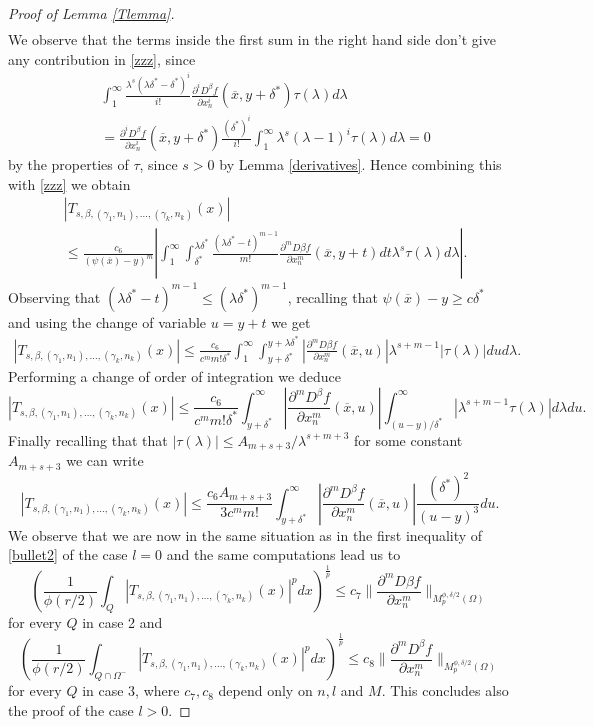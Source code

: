 \documentclass[12pt]{article}
\theoremstyle{definition}
\begin{document}
\begin{proof}[Proof of Lemma \ref{Tlemma}]
\begin{align*}
\end{align*}
We observe that the terms inside the first sum in the right hand side don't give any contribution in \eqref{zzz}, since
\begin{align*} &\int_1^\infty \frac{\lambda^s(\lambda \delta^*-\delta^*)^i}{i!}\frac{\partial^i D^\beta f}{\partial x_n^i}(\overline x,y+\delta^*)\tau(\lambda)d\lambda \\
&=\frac{\partial^i D^\beta f}{\partial x_n^i}(\overline x,y+\delta^*) \frac{(\delta^*)^i}{i!} \int_1^\infty \lambda^s(\lambda-1)^i\tau(\lambda)d\lambda=0
\end{align*}
by the properties of $\tau$, since $s>0$ by Lemma \ref{derivatives}. Hence combining this with \eqref{zzz} we obtain
\begin{align*}
&|T_{s,\beta,(\gamma_1,n_1),...,(\gamma_k,n_k)}(x) | \\
&\le \frac{c_6}{(\psi(\overline x)-y)^{m}} \left |\int_1^\infty \int_{\delta^*}^{\lambda \delta^*} \frac{(\lambda \delta^*-t)^{m-1}}{m!}\frac{\partial^{m} D\beta f}{\partial x_n^{m} }(\overline x,y+t)dt \lambda^s \tau(\lambda)d\lambda\right |.
\end{align*}
Observing that $(\lambda\delta^*-t)^{m-1}\le (\lambda\delta^*)^{m-1}$, recalling that $\psi(\overline x)-y\ge c \delta^*$ and using the change of variable $u=y+t$ we get
\begin{align*}
|T_{s,\beta,(\gamma_1,n_1),...,(\gamma_k,n_k)}(x) | \le \frac{c_6}{c^mm!\delta^*}\int_1^\infty \int_{y+\delta^*}^{y+\lambda \delta^*} \left|\frac{\partial^{m} D\beta f}{\partial x_n^{m} }(\overline x,u)\right |\lambda^{s+m-1} |\tau(\lambda)|du d\lambda.
\end{align*}
Performing a change of order of integration we deduce
\[ |T_{s,\beta,(\gamma_1,n_1),...,(\gamma_k,n_k)}(x) | \le\frac{c_6}{c^mm!\delta^*}\int_{y+\delta^*}^{\infty} \left |\frac{\partial^{m} D^\beta f}{\partial x_n^{m} }(\overline x,u)\right | \int_{(u-y)/\delta^*}^\infty |\lambda^{s+m-1} \tau(\lambda)| d\lambda du.\]
Finally recalling that that  $|\tau(\lambda)|\le A_{m+s+3}/\lambda^{s+m+3}$ for some constant $A_{m+s+3}$ we can write
\[ |T_{s,\beta,(\gamma_1,n_1),...,(\gamma_k,n_k)}(x) | \le\frac{c_6 A_{m+s+3}}{3c^mm!} \int_{y+\delta^*}^{\infty} \left |\frac{\partial^{m} D^\beta f}{\partial x_n^{m} }(\overline x,u)\right | \frac{(\delta^*)^2}{(u-y)^3} du.\]
We observe that we are now in the same situation as in the first inequality of \eqref{bullet2} of the case $l=0$ and the same computations lead us to
\[\left( \frac{1}{\phi(r/2)}\int_Q  \left| T_{s,\beta,(\gamma_1,n_1),...,(\gamma_k,n_k)}(x)\right|^p dx\right )^{\frac{1}{p}} \le c_7 \bigl\| \frac{\partial^{m} D\beta f}{\partial x_n^{m} } \bigr\|_{M_p^{\phi,\delta/2}(\Omega)} \] 
for every $Q$ in case 2  and
\[\left( \frac{1}{\phi(r/2)}\int_{Q\cap \Omega^-}  \left| T_{s,\beta,(\gamma_1,n_1),...,(\gamma_k,n_k)}(x)\right|^p dx\right )^{\frac{1}{p}} \le c_8 \bigl\| \frac{\partial^{m} D^\beta f}{\partial x_n^{m} } \bigr\|_{M_p^{\phi,\delta/2}(\Omega)} \] 
for every $Q$ in case 3, where $c_7,c_8$ depend only on $n,l$ and $M$. This concludes also the proof of the case $l>0.$
\end{proof} 
\end{document}
